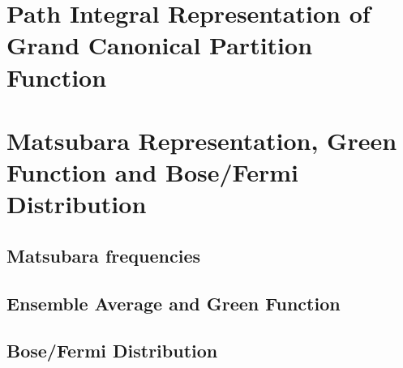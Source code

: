 \documentclass{article}
\begin{document}
\section{Path Integral Representation of Grand Canonical Partition Function}

\section{Matsubara Representation, Green Function and Bose/Fermi Distribution}
\subsection{Matsubara frequencies}
\subsection{Ensemble Average and Green Function}
\subsection{Bose/Fermi Distribution}
\end{document}
